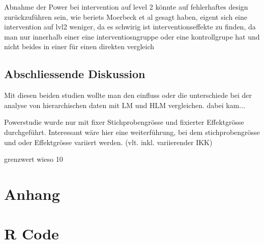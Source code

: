 \documentclass[12pt]{article}\usepackage[]{graphicx}\usepackage[]{color}
\begin{document}
Abnahme der Power bei intervention auf level 2 könnte auf fehlerhaftes design zurückzuführen sein, wie beriets Moerbeck et al gesagt haben, eigent sich eine intervention auf lvl2 weniger, da es schwirig ist interventionseffekte zu finden, da man nur innerhalb einer eine interventiosngruppe oder eine kontrollgrupe hat und nicht beides in einer für einen direkten vergleich

\subsection{Abschliessende Diskussion}
Mit diesen beiden studien wollte man den einfluss oder die unterschiede bei der analyse von hierarchischen daten mit LM und HLM vergleichen. dabei kam...

Powerstudie wurde nur mit fixer Stichprobengrösse und fixierter Effektgrösse durchgeführt. Interessant wäre hier eine weiterführung, bei dem stichprobengrösse und oder Effektgrösse variiert werden. (vlt. inkl. variierender IKK)


grenzwert wieso 10%

\newpage
\singlespacing




\section{Anhang}
\appendix
\section{R Code}
\end{document}
